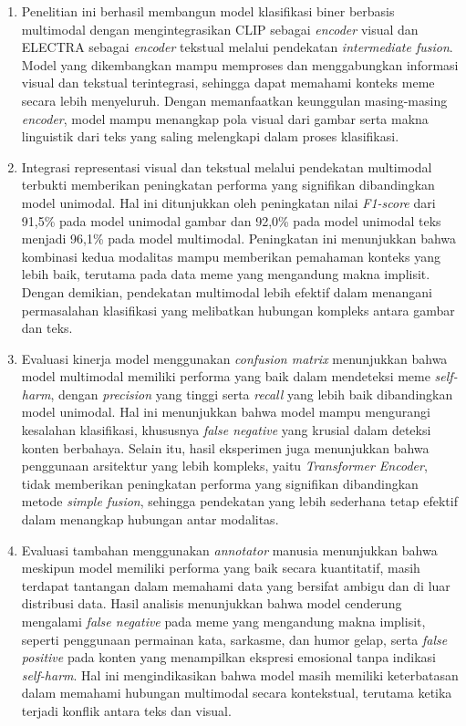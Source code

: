 \begin{enumerate}
    \item Penelitian ini berhasil membangun model klasifikasi biner berbasis multimodal dengan mengintegrasikan CLIP sebagai \textit{encoder} visual dan ELECTRA sebagai \textit{encoder} tekstual melalui pendekatan \textit{intermediate fusion}. Model yang dikembangkan mampu memproses dan menggabungkan informasi visual dan tekstual terintegrasi, sehingga dapat memahami konteks meme secara lebih menyeluruh. Dengan memanfaatkan keunggulan masing-masing \textit{encoder}, model mampu menangkap pola visual dari gambar serta makna linguistik dari teks yang saling melengkapi dalam proses klasifikasi.

    \item Integrasi representasi visual dan tekstual melalui pendekatan multimodal terbukti memberikan peningkatan performa yang signifikan dibandingkan model unimodal. Hal ini ditunjukkan oleh peningkatan nilai \textit{F1-score} dari 91,5\% pada model unimodal gambar dan 92,0\% pada model unimodal teks menjadi 96,1\% pada model multimodal. Peningkatan ini menunjukkan bahwa kombinasi kedua modalitas mampu memberikan pemahaman konteks yang lebih baik, terutama pada data meme yang mengandung makna implisit. Dengan demikian, pendekatan multimodal lebih efektif dalam menangani permasalahan klasifikasi yang melibatkan hubungan kompleks antara gambar dan teks.

    \item Evaluasi kinerja model menggunakan \textit{confusion matrix} menunjukkan bahwa model multimodal memiliki performa yang baik dalam mendeteksi meme \textit{self-harm}, dengan \textit{precision} yang tinggi serta \textit{recall} yang lebih baik dibandingkan model unimodal. Hal ini menunjukkan bahwa model mampu mengurangi kesalahan klasifikasi, khususnya \textit{false negative} yang krusial dalam deteksi konten berbahaya. Selain itu, hasil eksperimen juga menunjukkan bahwa penggunaan arsitektur yang lebih kompleks, yaitu \textit{Transformer Encoder}, tidak memberikan peningkatan performa yang signifikan dibandingkan metode \textit{simple fusion}, sehingga pendekatan yang lebih sederhana tetap efektif dalam menangkap hubungan antar modalitas.

    \item Evaluasi tambahan menggunakan \textit{annotator} manusia menunjukkan bahwa meskipun model memiliki performa yang baik secara kuantitatif, masih terdapat tantangan dalam memahami data yang bersifat ambigu dan di luar distribusi data. Hasil analisis menunjukkan bahwa model cenderung mengalami \textit{false negative} pada meme yang mengandung makna implisit, seperti penggunaan permainan kata, sarkasme, dan humor gelap, serta \textit{false positive} pada konten yang menampilkan ekspresi emosional tanpa indikasi \textit{self-harm}. Hal ini mengindikasikan bahwa model masih memiliki keterbatasan dalam memahami hubungan multimodal secara kontekstual, terutama ketika terjadi konflik antara teks dan visual.
\end{enumerate}

